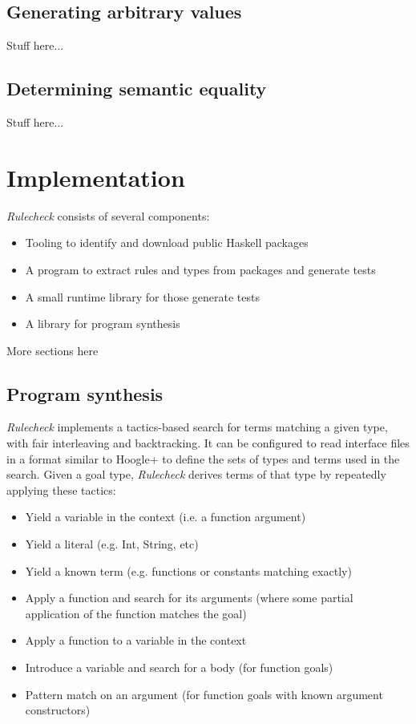 \documentclass[format=sigconf, nonacm=true, review=true, screen=true]{acmart}
\newcommand{\Rulecheck}{\textit{Rulecheck}\xspace}
\begin{document}
\subsection{Generating arbitrary values}

Stuff here...

\subsection{Determining semantic equality}

Stuff here...

\section{Implementation}

\Rulecheck consists of several components:

\begin{itemize}
  \item Tooling to identify and download public Haskell packages
  \item A program to extract rules and types from packages and generate tests
  \item A small runtime library for those generate tests
  \item A library for program synthesis
\end{itemize}

More sections here

\subsection{Program synthesis}

\Rulecheck implements a tactics-based search for terms matching a given type, with fair interleaving and backtracking. \cite{delahaye2000tactic, kiselyov2005backtracking} It can be configured to read interface files in a format similar to Hoogle+ \cite{james2020digging} to define the sets of types and terms used in the search. Given a goal type, \Rulecheck derives terms of that type by repeatedly applying these tactics:

\begin{itemize}
  \item Yield a variable in the context (i.e. a function argument)
  \item Yield a literal (e.g. Int, String, etc)
  \item Yield a known term (e.g. functions or constants matching exactly)
  \item Apply a function and search for its arguments (where some partial application of the function matches the goal)
  \item Apply a function to a variable in the context
  \item Introduce a variable and search for a body (for function goals)
  \item Pattern match on an argument (for function goals with known argument constructors)
\end{itemize}
\end{document}
